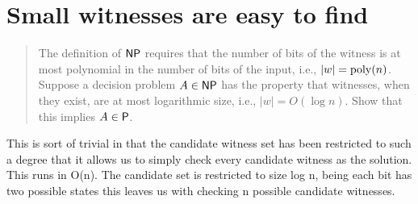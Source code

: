 \section*{Small witnesses are easy to find}
    \begin{quote}
    The definition of $\NP$ requires that the number of bits of the witness is at most polynomial in the number of bits of the input, i.e., $|w| = \poly(n)$.
    Suppose a decision problem $A \in \NP$ has the property that witnesses,
    when they exist, are at most logarithmic size,
    i.e., $|w| = O(\log n)$.
    Show that this implies $A \in \P$.
    \end{quote}

	This is sort of trivial in that the candidate witness set has been restricted to such a degree that it allows us to simply check every candidate witness as the solution. This runs in O(n). The candidate set is restricted to size log n, being each bit has two possible states this leaves us with checking n possible candidate witnesses.
